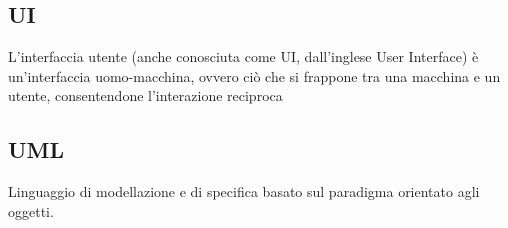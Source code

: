 \documentclass[../glossario.tex]{subfiles}
\begin{document}
\subsection*{UI}
L'interfaccia utente (anche conosciuta come UI, dall'inglese User Interface) è un'interfaccia uomo-macchina, ovvero ciò che si frappone tra una macchina e un utente, consentendone l'interazione reciproca


\subsection*{UML}
Linguaggio di modellazione e di specifica basato sul paradigma orientato agli oggetti.

    
\end{document}
